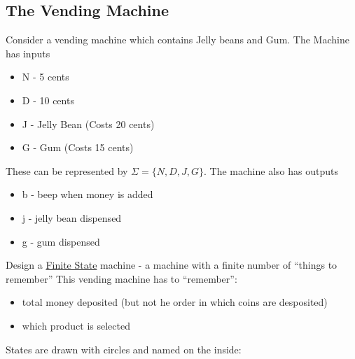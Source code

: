\documentclass{scrartcl}
\begin{document}
\subsection{The Vending Machine}
Consider a vending machine which contains Jelly beans and Gum. The Machine has inputs
\begin{itemize}
\item N - 5 cents
\item D - 10 cents
\item J - Jelly Bean (Costs 20 cents)
\item G - Gum (Costs 15 cents)
\end{itemize}
These can be represented by $\Sigma=\{N,D,J,G\}$. The machine also has outputs
\begin{itemize}
\item b - beep when money is added
\item j - jelly bean dispensed
\item g - gum dispensed
\end{itemize}
Design a \underline{Finite State} machine - a machine with a finite number of ``things to remember''
This vending machine has to ``remember'':
\begin{itemize}
\item total money deposited (but not he order in which coins are desposited)
\item which product is selected
\end{itemize}
States are drawn with circles and named on the inside:\\
\end{document}
